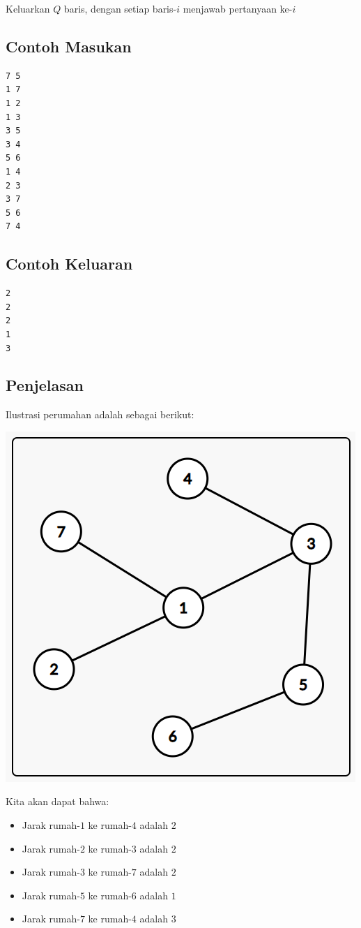 \documentclass{article}
\begin{document}
Keluarkan $Q$ baris, dengan setiap baris-$i$ menjawab pertanyaan ke-$i$

\begin{multicols}{2}
\subsection*{Contoh Masukan}
\begin{lstlisting}
7 5
1 7
1 2
1 3
3 5
3 4
5 6
1 4
2 3
3 7
5 6
7 4

\end{lstlisting}
\columnbreak
\subsection*{Contoh Keluaran}
\begin{lstlisting}
2
2
2
1
3
\end{lstlisting}
\vfill
\null
\end{multicols}
\pagebreak
\subsection*{Penjelasan}
Ilustrasi perumahan adalah sebagai berikut:
\begin{center}
\includegraphics[scale=0.6]{graf}
\end{center}
Kita akan dapat bahwa:
\begin{itemize}
	\item Jarak rumah-$1$ ke rumah-$4$ adalah $2$
	\item Jarak rumah-$2$ ke rumah-$3$ adalah $2$
	\item Jarak rumah-$3$ ke rumah-$7$ adalah $2$
	\item Jarak rumah-$5$ ke rumah-$6$ adalah $1$
	\item Jarak rumah-$7$ ke rumah-$4$ adalah $3$
\end{itemize}


\pagebreak
\end{document}
